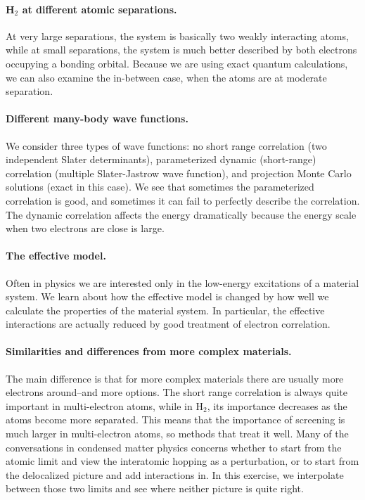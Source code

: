 \documentclass[12pt]{article}
\begin{document}
\paragraph{H$_2$ at different atomic separations.} 
At very large separations, the system is basically two weakly interacting atoms, while at small separations, the system is much better described by both electrons occupying a bonding orbital.
Because we are using exact quantum calculations, we can also examine the in-between case, when the atoms are at moderate separation.

\paragraph{Different many-body wave functions.} 
We consider three types of wave functions: no short range correlation (two independent Slater determinants), parameterized dynamic (short-range) correlation (multiple Slater-Jastrow wave function), and projection Monte Carlo solutions (exact in this case).
We see that sometimes the parameterized correlation is good, and sometimes it can fail to perfectly describe the correlation. 
The dynamic correlation affects the energy dramatically because the energy scale when two electrons are close is large.

\paragraph{The effective model.}
Often in physics we are interested only in the low-energy excitations of a material system. 
We learn about how the effective model is changed by how well we calculate the properties of the material system. 
In particular, the effective interactions are actually reduced by good treatment of electron correlation. 


\paragraph{Similarities and differences from more complex materials.}
The main difference is that for more complex materials there are usually more electrons around--and more options. 
The short range correlation is always quite important in multi-electron atoms, while in H$_2$, its importance decreases as the atoms become more separated.
This means that the importance of screening is much larger in multi-electron atoms, so methods that treat it well.
Many of the conversations in condensed matter physics concerns whether to start from the atomic limit and view the interatomic hopping as a perturbation, or to start from the delocalized picture and add interactions in. 
In this exercise, we interpolate between those two limits and see where neither picture is quite right.
\end{document}
